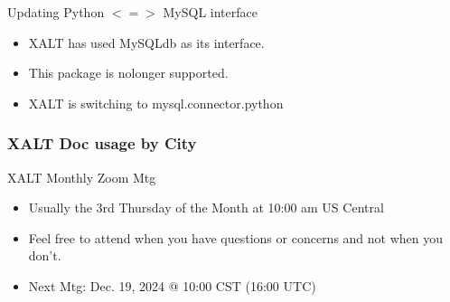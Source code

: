\documentclass{beamer}
\begin{document}
\begin{frame}{Updating Python $<=>$ MySQL interface}
  \begin{itemize}
    \item XALT has used MySQLdb as its interface.
    \item This package is nolonger supported.
    \item XALT is switching to mysql.connector.python 
  \end{itemize}
\end{frame}



\begin{frame}[fragile]
    \frametitle{XALT Doc usage by City}
\end{frame}

\begin{frame}{XALT Monthly Zoom Mtg}
  \begin{itemize}
    \item Usually the 3rd Thursday of the Month at 10:00 am US Central
    \item Feel free to attend when you have questions or concerns and
      not when you don't.
    \item Next Mtg: Dec. 19, 2024 @ 10:00 CST (16:00 UTC)
  \end{itemize}
\end{frame}
\end{document}
